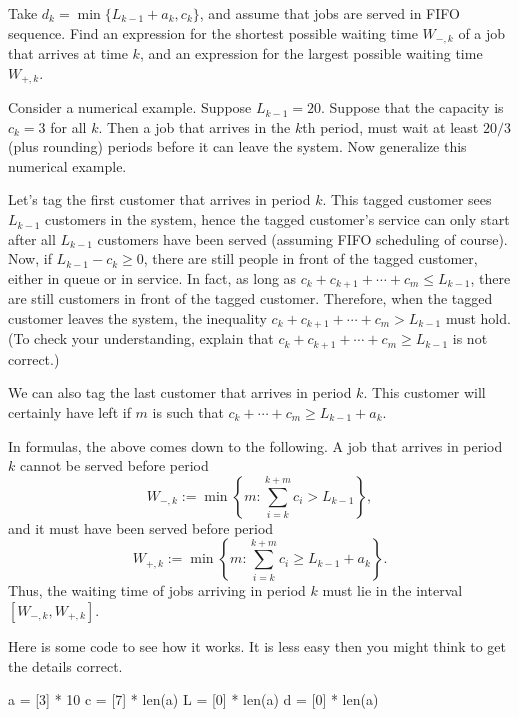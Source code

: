 \begin{exercise}  
Take $d_k = \min\{L_{k-1}+a_k, c_k\}$, and assume that jobs are served in FIFO sequence.
 Find an expression for the shortest possible waiting time $W_{-,k}$ of a job that arrives at time $k$, and an expression for the largest possible waiting time $W_{+,k}$.
\begin{hint}
 Consider a numerical example.
 Suppose $L_{k-1}=20$.
 Suppose that the capacity is $c_k=3$ for all $k$.
 Then a job that arrives in the $k$th period, must wait at least $20/3$ (plus rounding) periods before it can leave the system.
 Now generalize this numerical example.
\end{hint}
\begin{solution}
 Let's tag the first customer that arrives in period $k$.
 This tagged customer sees $L_{k-1}$ customers in the system, hence the tagged customer's service can only start after all $L_{k-1}$ customers have been served (assuming FIFO scheduling of course).
 Now, if $L_{k-1}-c_k \geq 0$, there are still people in front of the tagged customer, either in queue or in service.
 In fact, as long as $c_k+c_{k+1}+\cdots +c_m \leq L_{k-1}$, there are still customers in front of the tagged customer.
 Therefore, when the tagged customer leaves the system, the inequality $c_k+c_{k+1}+\cdots +c_m > L_{k-1}$ must hold.
 (To check your understanding, explain that $c_k+c_{k+1}+\cdots +c_m \geq L_{k-1}$ is not correct.)

 We can also tag the last customer that arrives in period $k$.
 This customer will certainly have left if $m$ is such that $c_k+\cdots+c_m \geq L_{k-1}+a_k$.

 In formulas, the above comes down to the following.
 A job that arrives in period $k$ cannot be served before period
 \begin{equation*}
 W_{-,k}:= \min\left\{m: \sum_{i=k}^{k+m} c_i > L_{k-1}\right\},
 \end{equation*}
 and it must have been served before period
 \begin{equation*}
 W_{+,k}:= \min\left\{m: \sum_{i=k}^{k+m} c_i \geq
 L_{k-1}+a_k\right\}.
 \end{equation*}
 Thus, the waiting time of jobs arriving in period $k$ must lie in
 the interval $[W_{-,k}, W_{+,k}]$.

Here is some code to see how it works. It is less easy then you might think to get the details correct. 
\begin{pyconsole}
a = [3] * 10
c = [7] * len(a)
L = [0] * len(a)
d = [0] * len(a)


\end{pyconsole}
\end{solution}
\end{exercise}
